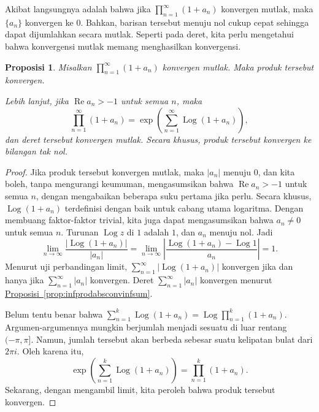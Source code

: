 \documentclass[12pt,openany]{book}
\renewcommand{\Re}{\operatorname{Re}}
\newcommand{\Log}{\operatorname{Log}}
\newcommand{\sabs}[1]{\lvert {#1} \rvert}
\newcommand{\abs}[1]{\left\lvert {#1} \right\rvert}
\theoremstyle{plain}
\newtheorem{prop}[thm]{Proposisi}
\theoremstyle{remark}
\theoremstyle{definition}
\theoremstyle{exercise}
\theoremstyle{example}
\newcommand{\propref}[1]{\hyperref[#1]{Proposisi~\ref*{#1}}}
\begin{document}
Akibat langsungnya adalah bahwa jika 
$\prod_{n=1}^\infty (1+a_n)$ konvergen mutlak, maka
$\{ a_n \}$ konvergen ke $0$.  Bahkan, barisan tersebut
menuju nol cukup cepat sehingga dapat dijumlahkan secara mutlak.
Seperti pada deret, kita perlu mengetahui bahwa konvergensi mutlak memang menghasilkan konvergensi.

\begin{prop} \label{prop:infproductwithlogs}
Misalkan $\prod_{n=1}^\infty (1+a_n)$ konvergen mutlak.
Maka produk tersebut konvergen.

Lebih lanjut, jika $\Re a_n > -1$ untuk semua $n$, maka 
\begin{equation*}
\prod_{n=1}^\infty (1+a_n)
=
\exp\left(
\sum_{n=1}^\infty \Log(1+a_n)
\right),
\end{equation*}
dan deret tersebut konvergen mutlak.  Secara khusus, produk tersebut
konvergen ke bilangan tak nol.
\end{prop}

\begin{proof}
Jika produk tersebut konvergen mutlak, maka $\sabs{a_n}$ menuju $0$, dan kita
boleh, tanpa mengurangi keumuman, mengasumsikan bahwa $\Re a_n > -1$ untuk semua $n$,
dengan mengabaikan beberapa suku pertama jika perlu.  Secara khusus,
$\Log (1+a_n)$ terdefinisi dengan baik untuk cabang utama logaritma.
Dengan membuang faktor-faktor trivial, kita juga dapat mengasumsikan bahwa $a_n\neq 0$ untuk semua $n$.
Turunan $\Log z$ di $1$ adalah $1$, dan $a_n$ menuju nol.
Jadi
\begin{equation*}
\lim_{n \to \infty}
\frac{
\abs{\Log (1+a_n)}
}{
\sabs{a_n}
}
=
\lim_{n \to \infty}
\abs{
\frac{
\Log (1+a_n)-\Log 1
}{
a_n
}
}
=1 .
\end{equation*}
Menurut uji perbandingan limit,
$\sum_{n=1}^\infty \abs{\Log (1+a_n)}$
konvergen jika dan hanya jika
$\sum_{n=1}^\infty \sabs{a_n}$ konvergen.
Deret
$\sum_{n=1}^\infty \sabs{a_n}$ konvergen
menurut \propref{prop:infprodabsconvinfsum}.

Belum tentu benar bahwa
$\sum_{n=1}^k \Log (1+a_n) = \Log \prod_{n=1}^k (1+a_n)$.
Argumen-argumennya mungkin berjumlah menjadi sesuatu di luar
rentang $(-\pi,\pi]$.  Namun, jumlah tersebut akan berbeda sebesar suatu kelipatan bulat dari $2\pi i$.
Oleh karena itu,
\begin{equation*}
\exp\left(
\sum_{n=1}^k \Log(1+a_n)
\right)
=
\prod_{n=1}^k (1+a_n) .
\end{equation*}
Sekarang, dengan mengambil limit, kita peroleh
bahwa produk tersebut konvergen.
\end{proof}
\end{document}
